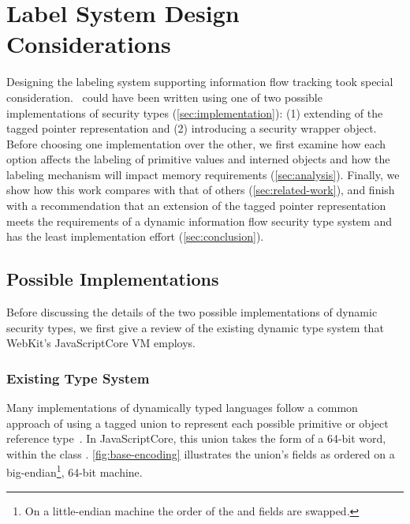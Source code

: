 
\chapter{Label System Design Considerations}
\label{ch:system-design}

Designing the labeling system supporting information flow tracking took special consideration.
\FlowCore\ could have been written using one of two possible implementations of security types (\autoref{sec:implementation}): (1) extending of the tagged pointer representation and (2) introducing a security wrapper object.
Before choosing one implementation over the other, we first examine how each option affects the labeling of primitive values and interned objects and how the labeling mechanism will impact memory requirements (\autoref{sec:analysis}).
Finally, we show how this work compares with that of others (\autoref{sec:related-work}), and finish with a recommendation that an extension of the tagged pointer representation meets the requirements of a dynamic information flow security type system and has the least implementation effort (\autoref{sec:conclusion}).

\section{Possible Implementations}
\label{sec:implementation}

Before discussing the details of the two possible implementations of dynamic security types, we first give a review of the existing dynamic type system that WebKit's JavaScriptCore VM employs.

\subsection{Existing Type System}
\label{sec:existing-type-system}

Many implementations of dynamically typed languages follow a common approach of using a tagged union to represent each possible primitive or object reference type~\cite{gudeman+93}.
In JavaScriptCore, this union takes the form of a 64-bit word, within the class .
\autoref{fig:base-encoding} illustrates the union's fields as ordered on a big-endian\footnote{On a little-endian machine the order of the  and  fields are swapped.}, 64-bit machine.


